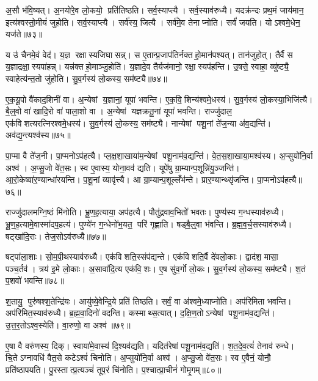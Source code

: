 अ॒सौ भ॑वि॒ष्यत्। अ॒नयो॑रे॒व लो॒कयो॒ प्रति॑तिष्ठति। सर्व॒स्याप्त्यै। सर्व॒स्याव॑रुध्यै। यदक्र॑न्दः प्रथ॒मं जाय॑मान॒ इत्य॑श्वस्तो॒मीयं॑ जुहोति। सर्व॒स्याप्त्यै। सर्व॑स्य॒ जित्यै। सर्व॑मे॒व तेनाप्नोति। सर्वं॑ जयति। योऽश्वमे॒धेन॒ यज॑ते॥७३॥

य उ॑ चैनमे॒वं वेद॑। य॒ज्ञ रक्षास्यजिघासन्न्। स ए॒तान्प्र॒जाप॑तिर्नक्तहो॒मान॑पश्यत्। तान॑जुहोत्। तैर्वै स य॒ज्ञाद्रक्षा॒स्यपा॑हन्न्। यन्न॑क्तहो॒माञ्जु॒होति॑। य॒ज्ञादे॒व तैर्यज॑मानो॒ रक्षा॒स्यप॑हन्ति। उ॒षसे॒ स्वाहा॒ व्यु॑ष्ट्यै॒ स्वाहेत्य॑न्त॒तो जु॑होति। सु॒व॒र्गस्य॑ लो॒कस्य॒ सम॑ष्ट्यै॥७४॥\anuvakamend[वै नभासि॒ सूर्यो॒ ज्योति॒स्सन्त॑त्यै॒ सम॑ष्ट्यै भू॒तं यज॑ते॒ नव॑ च]

ए॒क॒यू॒पो वै॑काद॒शिनी॑ वा। अ॒न्येषां य॒ज्ञानां॒ यूपा॑ भवन्ति। ए॒क॒वि॒शिन्य॑श्वमे॒धस्य॑। सु॒व॒र्गस्य॑ लो॒कस्या॒भिजि॑त्यै। बै॒ल्॒वो वा॑ खादि॒रो वा॑ पाला॒शो वा। अ॒न्येषां यज्ञक्रतू॒नां यूपा॑ भवन्ति। राज्जु॑दाल॒ एक॑विशत्यरत्निरश्वमे॒धस्य॑। सु॒व॒र्गस्य॑ लो॒कस्य॒ सम॑ष्ट्यै। नान्येषां पशू॒नां ते॑ज॒न्या अ॑व॒द्यन्ति॑। अव॑द्य॒न्त्यश्व॑स्य॥७५॥

पा॒प्मा वै ते॑ज॒नी। पा॒प्मनोऽप॑हत्यै। प्ल॒क्ष॒शा॒खाया॑म॒न्येषां पशू॒नाम॑व॒द्यन्ति॑। वे॒त॒स॒शा॒खाया॒मश्व॑स्य। अ॒प्सुयो॑नि॒र्वा अश्व॑। अ॒प्सु॒जो वे॑त॒सः। स्व ए॒वास्य॒ योना॒वव॑ द्यति। यूपे॑षु ग्रा॒म्यान्प॒शून्नि॑यु॒ञ्जन्ति॑। आ॒रो॒केष्वा॑र॒ण्यान्धा॑रयन्ति। प॒शू॒नां व्यावृ॑त्त्यै। आ ग्रा॒म्यान्प॒शूल्लँभ॑न्ते। प्रार॒ण्यान्थ्सृ॑जन्ति। पा॒प्मनोऽप॑हत्यै॥७६॥\anuvakamend[अश्व॑स्य॒ व्यावृ॑त्त्यै॒ त्रीणि॑ च]

राज्जु॑दालमग्नि॒ष्ठं मि॑नोति। भ्रू॒ण॒ह॒त्याया॒ अप॑हत्यै। पौतु॑द्रवाव॒भितो॑ भवतः। पुण्य॑स्य ग॒न्धस्याव॑रुध्यै। भ्रू॒ण॒ह॒त्यामे॒वास्मा॑दप॒हत्य॑। पुण्ये॑न ग॒न्धेनो॑भ॒यत॒ परि॑ गृह्णाति। षड्बै॒ल्॒वा भ॑वन्ति। ब्र॒ह्म॒व॒र्च॒सस्याव॑रुध्यै। षट्खा॑दि॒राः। तेज॒सोऽव॑रुध्यै॥७७॥

षट्पा॑ला॒शाः। सो॒म॒पी॒थस्याव॑रुध्यै। एक॑विशति॒स्संप॑द्यन्ते। एक॑विशति॒र्वै दे॑वलो॒काः। द्वाद॑श॒ मासा॒ पञ्च॒र्तव॑। त्रय॑ इ॒मे लो॒काः। अ॒सावा॑दि॒त्य एक॑वि॒शः। ए॒ष सु॑व॒र्गो लो॒कः। सु॒व॒र्गस्य॑ लो॒कस्य॒ सम॑ष्ट्यै। श॒तं प॒शवो॑ भवन्ति॥७८॥

श॒तायु॒ पुरु॑षश्श॒तेन्द्रि॑यः। आयु॑ष्ये॒वेन्द्रि॒ये प्रति॑ तिष्ठति। सर्वं॒ वा अ॑श्वमे॒ध्याप्नो॑ति। अप॑रिमिता भवन्ति। अप॑रिमित॒स्याव॑रुध्यै। ब्र॒ह्म॒वा॒दिनो॑ वदन्ति। कस्माथ्स॒त्यात्। द॒क्षि॒ण॒तोऽन्येषां पशू॒नाम॑व॒द्यन्ति॑। उ॒त्त॒र॒तोऽश्व॒स्येति॑। वा॒रुणो॒ वा अश्व॑॥७९॥

ए॒षा वै वरु॑णस्य॒ दिक्। स्वाया॑मे॒वास्य॑ दि॒श्यव॑द्यति। यदित॑रेषां पशू॒नाम॑व॒द्यति॑। श॒त॒दे॒व॒त्यं॑ तेनाव॑ रुन्धे। चि॒तेऽग्नावधि॑ वैत॒से कटेऽश्वं॑ चिनोति। अ॒प्सुयो॑नि॒र्वा अश्व॑। अ॒प्सु॒जो वे॑त॒सः। स्व ए॒वैनं॒ योनौ॒ प्रति॑ष्ठापयति। पु॒रस्तात्प्र॒त्यञ्चं॑ तूप॒रं चि॑नोति। प॒श्चात्प्रा॒चीनं॑ गोमृ॒गम्॥८०॥

